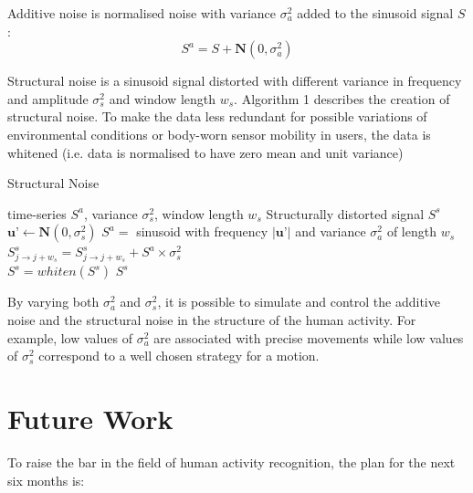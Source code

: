 \documentclass[10pt,journal,compsoc]{IEEEtran}
\begin{document}
Additive noise is normalised noise with variance $\sigma_a ^2$ added to the
sinusoid signal $S$: 
\begin{equation}
 S^a = S + \textbf{N}(0, \sigma_a ^2)
\end{equation} 

Structural noise is a sinusoid signal distorted with different variance 
in frequency and amplitude $\sigma_s ^2$ and window length $w_s$. 
Algorithm 1 describes the creation of structural noise.
To make the data less redundant for possible variations of environmental 
conditions or body-worn sensor mobility in users, the data is whitened 
(i.e. data is normalised to have zero mean and unit variance) 


\begin{algorithm}[H]
\caption{Structural Noise}
\begin{algorithmic}[1]
 \renewcommand{\algorithmicrequire}{\textbf{Input:}}
 \renewcommand{\algorithmicensure}{\textbf{Output:}}
 \REQUIRE time-series $S^a$, variance $\sigma_s ^2$, window length $w_s$
 \ENSURE  Structurally distorted signal $S^s$
  \STATE $\textbf{u'} \leftarrow \textbf{N}(0, \sigma_s ^2)$
  \STATE $S^{a} =$ sinusoid with frequency $| \textbf{u'} |$ and variance $\sigma_a ^2$ of length $w_s$
  \STATE $S^s_{j \rightarrow j+w_s}  = S^s_{j \rightarrow j+w_s}  + S^{a} \times   \sigma_s ^2 $
  \ENDFOR
  \\ $S^s= whiten (S^s)$
 \RETURN $S^s$
\end{algorithmic}
\end{algorithm}

By varying both $\sigma_a ^2$ and $\sigma_s ^2$, 
it is possible to simulate and control the additive noise and the structural noise 
in the structure of the human activity. For example, low values of $\sigma_a ^2$ 
are associated with precise movements while low values of $\sigma_s ^2$ correspond 
to a well chosen strategy for a motion.



\section{Future Work} 
To raise the bar in the field of human activity recognition,
the plan for the next six months is:
\end{document}
